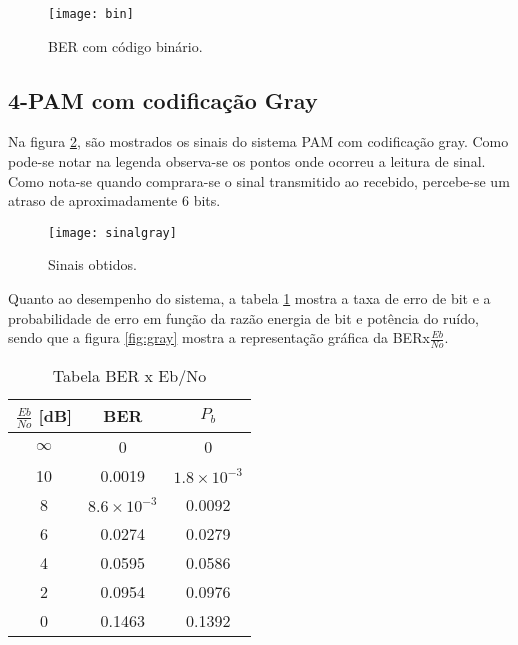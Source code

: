 \begin{figure}[H]
    \centering
    \texttt{[image: bin]}
    \caption{BER com código binário.}
    \label{fig:bin}
\end{figure}



\subsection{4-PAM com codificação Gray}

Na figura \ref{fig:sinais2}, são mostrados os sinais do sistema PAM com codificação gray. Como pode-se notar na legenda observa-se os pontos onde ocorreu a leitura de sinal. Como nota-se quando comprara-se o sinal transmitido ao recebido, percebe-se um atraso de aproximadamente 6 bits.

\begin{figure}[H]
    \centering
    \texttt{[image: sinalgray]}
    \caption{Sinais obtidos.}
    \label{fig:sinais2}
\end{figure}

Quanto ao desempenho do sistema, a tabela \ref{tab:4} mostra a taxa de erro de bit e a probabilidade de erro em função da razão energia de bit e potência do ruído, sendo que a figura \ref{fig:gray} mostra a representação gráfica da BERx$\frac{Eb}{No}$.

\begin{small}
    \begin{table}[H]
        \begin{center}
            \caption{Tabela BER x Eb/No}
            \begin{tabular}{c|c|c}
                \hline
                $\frac{Eb}{No}$ [dB] & BER & $P_b$ \\
                \hline
                $\infty$ & 0 & 0 \\
                \hline
                10 & 0.0019 & $1.8 \times 10^{-3} $ \\
                \hline
                8 & $8.6 \times 10^{-3}$ & 0.0092 \\
                \hline
                6 & 0.0274 &  0.0279 \\
                \hline
                4 & 0.0595 & 0.0586 \\
                \hline
                2 & 0.0954 & 0.0976 \\
                \hline
                0 & 0.1463 & 0.1392 \\
                \hline
            \end{tabular}
            \label{tab:4}
        \end{center}
    \end{table}
\end{small}

